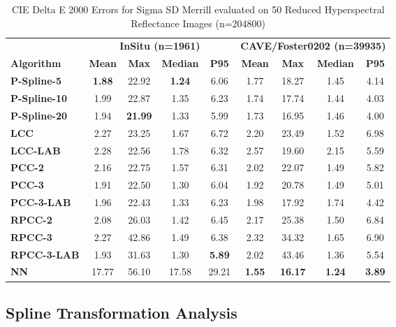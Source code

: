 \begin{table}[htbp]
  \centering
  \caption{CIE Delta E 2000 Errors for Sigma SD Merrill evaluated on 50 Reduced Hyperspectral Reflectance Images (n=204800)}
    \begin{tabular}{>{\bfseries}l@{\hspace{3mm}}cccc|cccc}
        \midrule
            & \multicolumn{4}{c}{\textbf{InSitu (n=1961)}} & \multicolumn{4}{c}{\textbf{CAVE/Foster0202 (n=39935)}} \\
        \cmidrule(lr){2-5} \cmidrule(lr){6-9}
            \textbf{Algorithm} & \textbf{Mean} & \textbf{Max} & \textbf{Median} & \textbf{P95} & \textbf{Mean} & \textbf{Max} & \textbf{Median} & \textbf{P95} \\
        \midrule
            P-Spline-5 & \textbf{1.88} & 22.92 & \textbf{1.24} & 6.06 & 1.77 & 18.27 & 1.45 & 4.14 \\
            P-Spline-10 & 1.99 & 22.87 & 1.35 & 6.23 & 1.74 & 17.74 & 1.44 & 4.03 \\
            P-Spline-20 & 1.94 & \textbf{21.99} & 1.33 & 5.99 & 1.73 & 16.95 & 1.46 & 4.00 \\
            LCC & 2.27 & 23.25 & 1.67 & 6.72 & 2.20 & 23.49 & 1.52 & 6.98 \\
            LCC-LAB & 2.28 & 22.56 & 1.78 & 6.32 & 2.57 & 19.60 & 2.15 & 5.59 \\
            PCC-2 & 2.16 & 22.75 & 1.57 & 6.31 & 2.02 & 22.07 & 1.49 & 5.82 \\
            PCC-3 & 1.91 & 22.50 & 1.30 & 6.04 & 1.92 & 20.78 & 1.49 & 5.01 \\
            PCC-3-LAB & 1.96 & 22.43 & 1.33 & 6.23 & 1.98 & 17.92 & 1.74 & 4.42 \\
            RPCC-2 & 2.08 & 26.03 & 1.42 & 6.45 & 2.17 & 25.38 & 1.50 & 6.84 \\
            RPCC-3 & 2.27 & 42.86 & 1.49 & 6.38 & 2.32 & 34.32 & 1.65 & 6.90 \\
            RPCC-3-LAB & 1.93 & 31.63 & 1.30 & \textbf{5.89} & 2.02 & 43.46 & 1.36 & 5.54 \\
            NN & 17.77 & 56.10 & 17.58 & 29.21 & \textbf{1.55} & \textbf{16.17} & \textbf{1.24} & \textbf{3.89} \\
        \bottomrule
    \end{tabular}
  \label{tab:sigma}
\end{table}

\subsection{Spline Transformation Analysis}

